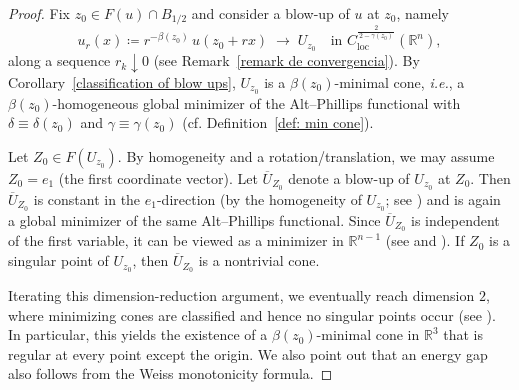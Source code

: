 \documentclass[reqno,11pt]{amsart}
\newcommand{\1}{\mathds{1}}
\numberwithin{equation}{section}
\begin{document}
\begin{proof}
Fix $z_0 \in F(u)\cap B_{1/2}$ and consider a blow-up of $u$ at $z_0$, namely
\[
    u_r(x) \coloneqq r^{-\beta(z_0)}\,u(z_0+rx) \;\longrightarrow\; U_{z_0}
    \quad\text{in } C^{\frac{2}{\,2-\gamma(z_0)\,}}_{\mathrm{loc}}(\mathbb{R}^n),
\]
along a sequence $r_k \downarrow 0$ (see Remark~\ref{remark de convergencia}). 
By Corollary~\ref{classification of blow ups}, $U_{z_0}$ is a $\beta(z_0)$-minimal cone, \textit{i.e.}, a $\beta(z_0)$-homogeneous global minimizer of the Alt--Phillips functional with 
$\delta \equiv \delta(z_0)$ and $\gamma \equiv \gamma(z_0)$ (cf. Definition~\ref{def: min cone}).

Let $Z_0 \in F(U_{z_0})$. By homogeneity and a rotation/translation, we may assume $Z_0=e_1$ (the first coordinate vector). Let $\overline{U}_{Z_0}$ denote a blow-up of $U_{z_0}$ at $Z_0$. Then $\overline{U}_{Z_0}$ is constant in the $e_1$-direction (by the homogeneity of $U_{z_0}$; see \cite[Lemma~5.4]{DSS0}) and is again a global minimizer of the same Alt--Phillips functional. Since $\overline{U}_{Z_0}$ is independent of the first variable, it can be viewed as a minimizer in $\mathbb{R}^{n-1}$ (see \cite[Proposition~3.13]{DSS0} and \cite[Proposition~5.3]{DSS2}). If $Z_0$ is a singular point of $U_{z_0}$, then $\overline{U}_{Z_0}$ is a nontrivial cone.

Iterating this dimension-reduction argument, we eventually reach dimension $2$, where minimizing cones are classified and hence no singular points occur (see \cite[Theorem~8.2]{AP}). In particular, this yields the existence of a $\beta(z_0)$-minimal cone in $\mathbb{R}^3$ that is regular at every point except the origin. We also point out that an energy gap also follows from the Weiss monotonicity formula.


\end{proof}
\end{document}
